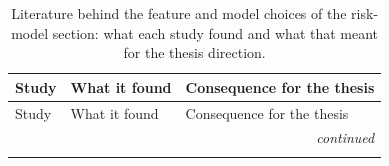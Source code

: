 \begingroup
\small
\setlength{\LTleft}{0pt}\setlength{\LTright}{0pt}
\begin{longtable}{@{}p{2.6cm}p{6.6cm}p{6.6cm}@{}}
\caption{Literature behind the feature and model choices of the risk-model section: what each study found and what that meant for the thesis direction.}\label{tab:risk-literature}\\
\toprule
Study & What it found & Consequence for the thesis \\
\midrule
\endfirsthead
\toprule
Study & What it found & Consequence for the thesis \\
\midrule
\endhead
\midrule \multicolumn{3}{r}{\emph{continued}}\\
\endfoot
\bottomrule
\endlastfoot


\end{longtable}
